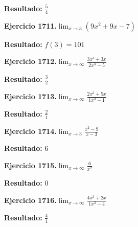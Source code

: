 \documentclass[10pt,a4paper]{article}
\begin{document}
\begin{solbox}
\textbf{Resultado:} \(\displaystyle \frac{5}{4}\)
\end{solbox}

\newpage
\begin{ejbox}
\textbf{Ejercicio 1711.}\quad $\lim_{x\to 3} (9x^2 +9x -7)$
\end{ejbox}

\begin{solbox}
\textbf{Resultado:} \(\displaystyle f(3) = 101\)
\end{solbox}

\begin{ejbox}
\textbf{Ejercicio 1712.}\quad $\lim_{x\to \infty} \frac{3x^3 + 3x}{2x^3 - 5}$
\end{ejbox}

\begin{solbox}
\textbf{Resultado:} \(\displaystyle \frac{3}{2}\)
\end{solbox}

\begin{ejbox}
\textbf{Ejercicio 1713.}\quad $\lim_{x\to \infty} \frac{2x^3 + 5x}{1x^3 - 1}$
\end{ejbox}

\begin{solbox}
\textbf{Resultado:} \(\displaystyle \frac{2}{1}\)
\end{solbox}

\newpage
\begin{ejbox}
\textbf{Ejercicio 1714.}\quad $\lim_{x\to 3} \frac{x^2-9}{x-3}$
\end{ejbox}

\begin{solbox}
\textbf{Resultado:} \(\displaystyle 6\)
\end{solbox}

\begin{ejbox}
\textbf{Ejercicio 1715.}\quad $\lim_{x\to \infty} \frac{6}{x^2}$
\end{ejbox}

\begin{solbox}
\textbf{Resultado:} \(\displaystyle 0\)
\end{solbox}

\begin{ejbox}
\textbf{Ejercicio 1716.}\quad $\lim_{x\to \infty} \frac{4x^3 + 2x}{1x^3 - 4}$
\end{ejbox}

\begin{solbox}
\textbf{Resultado:} \(\displaystyle \frac{4}{1}\)
\end{solbox}
\end{document}

